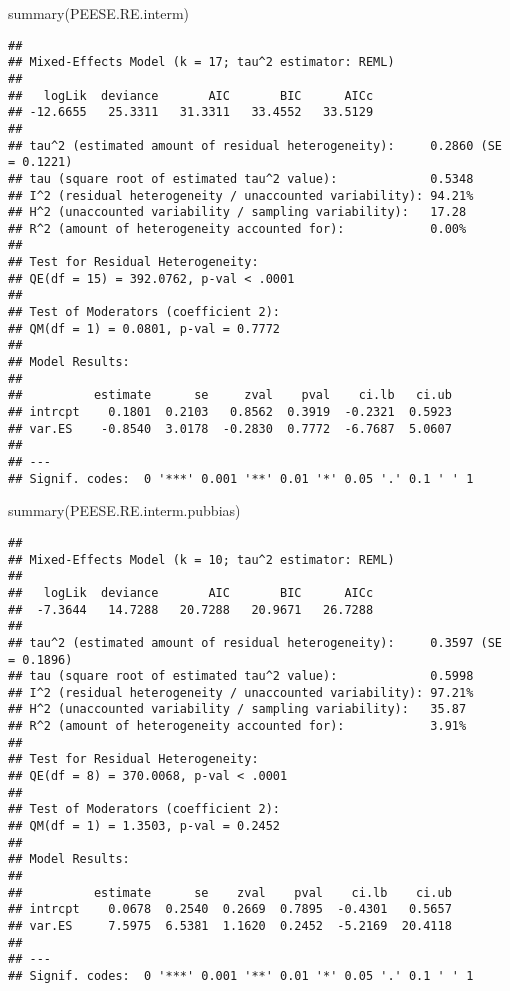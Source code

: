 \documentclass[
]{book}
\newenvironment{Shaded}{\begin{snugshade}}{\end{snugshade}}
\newcommand{\FunctionTok}[1]{\textcolor[rgb]{0.00,0.00,0.00}{#1}}
\newcommand{\NormalTok}[1]{#1}
\theoremstyle{definition}
\theoremstyle{definition}
\theoremstyle{definition}
\theoremstyle{definition}
\theoremstyle{remark}
\begin{document}
\begin{Shaded}
\begin{Highlighting}[]
\FunctionTok{summary}\NormalTok{(PEESE.RE.interm)}
\end{Highlighting}
\end{Shaded}

\begin{verbatim}
## 
## Mixed-Effects Model (k = 17; tau^2 estimator: REML)
## 
##   logLik  deviance       AIC       BIC      AICc 
## -12.6655   25.3311   31.3311   33.4552   33.5129   
## 
## tau^2 (estimated amount of residual heterogeneity):     0.2860 (SE = 0.1221)
## tau (square root of estimated tau^2 value):             0.5348
## I^2 (residual heterogeneity / unaccounted variability): 94.21%
## H^2 (unaccounted variability / sampling variability):   17.28
## R^2 (amount of heterogeneity accounted for):            0.00%
## 
## Test for Residual Heterogeneity:
## QE(df = 15) = 392.0762, p-val < .0001
## 
## Test of Moderators (coefficient 2):
## QM(df = 1) = 0.0801, p-val = 0.7772
## 
## Model Results:
## 
##          estimate      se     zval    pval    ci.lb   ci.ub 
## intrcpt    0.1801  0.2103   0.8562  0.3919  -0.2321  0.5923    
## var.ES    -0.8540  3.0178  -0.2830  0.7772  -6.7687  5.0607    
## 
## ---
## Signif. codes:  0 '***' 0.001 '**' 0.01 '*' 0.05 '.' 0.1 ' ' 1
\end{verbatim}

\begin{Shaded}
\begin{Highlighting}[]
\FunctionTok{summary}\NormalTok{(PEESE.RE.interm.pubbias)}
\end{Highlighting}
\end{Shaded}

\begin{verbatim}
## 
## Mixed-Effects Model (k = 10; tau^2 estimator: REML)
## 
##   logLik  deviance       AIC       BIC      AICc 
##  -7.3644   14.7288   20.7288   20.9671   26.7288   
## 
## tau^2 (estimated amount of residual heterogeneity):     0.3597 (SE = 0.1896)
## tau (square root of estimated tau^2 value):             0.5998
## I^2 (residual heterogeneity / unaccounted variability): 97.21%
## H^2 (unaccounted variability / sampling variability):   35.87
## R^2 (amount of heterogeneity accounted for):            3.91%
## 
## Test for Residual Heterogeneity:
## QE(df = 8) = 370.0068, p-val < .0001
## 
## Test of Moderators (coefficient 2):
## QM(df = 1) = 1.3503, p-val = 0.2452
## 
## Model Results:
## 
##          estimate      se    zval    pval    ci.lb    ci.ub 
## intrcpt    0.0678  0.2540  0.2669  0.7895  -0.4301   0.5657    
## var.ES     7.5975  6.5381  1.1620  0.2452  -5.2169  20.4118    
## 
## ---
## Signif. codes:  0 '***' 0.001 '**' 0.01 '*' 0.05 '.' 0.1 ' ' 1
\end{verbatim}
\end{document}
